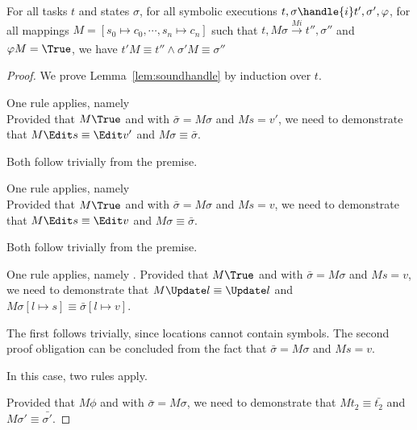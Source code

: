 \begin{lemma}
  \label{lem:soundhandle}

  For all tasks $t$ and states $\sigma$,
  for all symbolic executions $t,\sigma\handle{i} t',\sigma',\phi$,
  for all mappings $M = [s_0\mapsto c_0,\cdots,s_n\mapsto c_n]$
  such that $t,M \sigma \xrightarrow[]{M i} t'',\sigma''$ and $\phi M = \True$,
  we have $t'M \equiv t'' \wedge \sigma' M \equiv \sigma''$
\end{lemma}

\begin{proof}
  We prove Lemma~\ref{lem:soundhandle} by induction over $t$.\\

    {One rule applies, namely \\
    Provided that $M\True$ and  with $\bar{\sigma}=M\sigma$ and $M s = v'$,
    we need to demonstrate that $M \Edit s\equiv \Edit v'$ and $ M\sigma\equiv \bar{\sigma}$.

    Both follow trivially from the premise.

    }

  {One rule applies, namely \\
  Provided that $M\True$ and  with $\bar{\sigma}=M\sigma$ and $M s = v$,
  we need to demonstrate that $M \Edit s \equiv \Edit v$ and $ M\sigma\equiv \bar{\sigma}$.

  Both follow trivially from the premise.

  }

  {One rule applies, namely .
  Provided that $M\True$ and  with $\bar{\sigma}=M\sigma$ and $M s = v$,
  we need to demonstrate that $M \Update l \equiv \Update l$ and $ M\sigma[l\mapsto s]\equiv \bar{\sigma}[l\mapsto v]$.

  The first follows trivially, since locations cannot contain symbols. The second proof obligation can be concluded from the fact that $\bar{\sigma}=M\sigma$ and $M s = v$.

  }

  {
  In this case, two rules apply.\\
      {Provided that $M\phi$ and  with $\bar{\sigma}=M\sigma$,
      we need to demonstrate that $M t_2 \equiv \bar{t_2}$ and $M\sigma'\equiv\bar{\sigma'}$.

}}
\end{proof}
